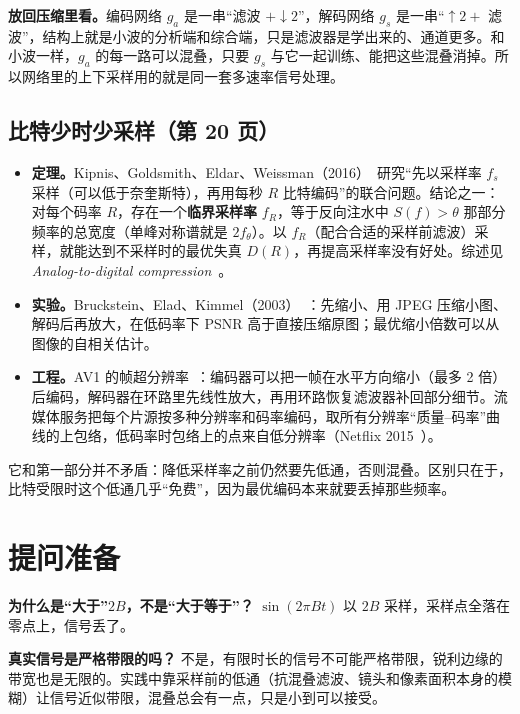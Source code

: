 \textbf{放回压缩里看。}编码网络 $g_a$ 是一串“滤波 $+\downarrow2$”，解码网络 $g_s$ 是一串“$\uparrow2+$ 滤波”，结构上就是小波的分析端和综合端，只是滤波器是学出来的、通道更多。和小波一样，$g_a$ 的每一路可以混叠，只要 $g_s$ 与它一起训练、能把这些混叠消掉。所以网络里的上下采样用的就是同一套多速率信号处理。

\subsection{比特少时少采样（第 20 页）}\label{sec:link}
\begin{itemize}
  \item \textbf{定理。}Kipnis、Goldsmith、Eldar、Weissman（2016）~\cite{kipnis2016}研究“先以采样率 $f_s$ 采样（可以低于奈奎斯特），再用每秒 $R$ 比特编码”的联合问题。结论之一：对每个码率 $R$，存在一个\textbf{临界采样率} $f_R$，等于反向注水中 $S(f)>\theta$ 那部分频率的总宽度（单峰对称谱就是 $2f_\theta$）。以 $f_R$（配合合适的采样前滤波）采样，就能达到不采样时的最优失真 $D(R)$，再提高采样率没有好处。综述见 \emph{Analog-to-digital compression}~\cite{kipnis2018}。
  \item \textbf{实验。}Bruckstein、Elad、Kimmel（2003）~\cite{bruckstein2003}：先缩小、用 JPEG 压缩小图、解码后再放大，在低码率下 PSNR 高于直接压缩原图；最优缩小倍数可以从图像的自相关估计。
  \item \textbf{工程。}AV1 的帧超分辨率~\cite{av1overview}：编码器可以把一帧在水平方向缩小（最多 2 倍）后编码，解码器在环路里先线性放大，再用环路恢复滤波器补回部分细节。流媒体服务把每个片源按多种分辨率和码率编码，取所有分辨率“质量--码率”曲线的上包络，低码率时包络上的点来自低分辨率（Netflix 2015~\cite{netflix2015}）。
\end{itemize}
它和第一部分并不矛盾：降低采样率之前仍然要先低通，否则混叠。区别只在于，比特受限时这个低通几乎“免费”，因为最优编码本来就要丢掉那些频率。

\section{提问准备}\label{sec:qa}

\textbf{为什么是“大于”$2B$，不是“大于等于”？}
$\sin(2\pi Bt)$ 以 $2B$ 采样，采样点全落在零点上，信号丢了。

\textbf{真实信号是严格带限的吗？}
不是，有限时长的信号不可能严格带限，锐利边缘的带宽也是无限的。实践中靠采样前的低通（抗混叠滤波、镜头和像素面积本身的模糊）让信号近似带限，混叠总会有一点，只是小到可以接受。

